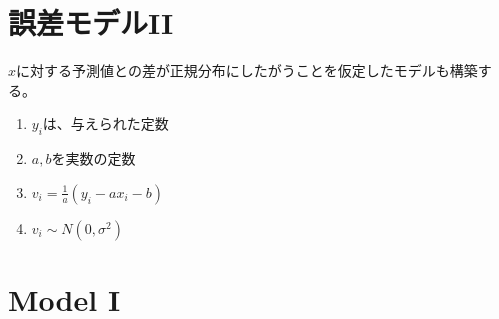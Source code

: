 \section{誤差モデルII}
$x$に対する予測値との差が正規分布にしたがうことを仮定したモデルも構築する。
\begin{enumerate}
 \item $y_i$は、与えられた定数
 \item $a,b$を実数の定数
 \item $v_i = \frac{1}{a}(y_i-a x_i -b)$
 \item $v_i \sim N(0,\sigma^2)$
\end{enumerate}



\section{Model I}

\fi

